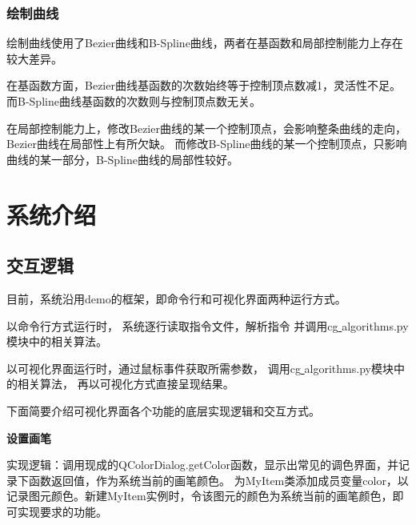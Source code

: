 \documentclass[a4paper,UTF8]{article}
\begin{document}
\subsubsection{绘制曲线}
绘制曲线使用了Bezier曲线和B-Spline曲线，两者在基函数和局部控制能力上存在较大差异。

在基函数方面，Bezier曲线基函数的次数始终等于控制顶点数减1，灵活性不足。
而B-Spline曲线基函数的次数则与控制顶点数无关。

在局部控制能力上，修改Bezier曲线的某一个控制顶点，会影响整条曲线的走向，Bezier曲线在局部性上有所欠缺。
而修改B-Spline曲线的某一个控制顶点，只影响曲线的某一部分，B-Spline曲线的局部性较好。



\section{系统介绍}
\subsection{交互逻辑}
目前，系统沿用demo的框架，即命令行和可视化界面两种运行方式。

以命令行方式运行时，
系统逐行读取指令文件，解析指令
并调用cg\underline{ }algorithms.py模块中的相关算法。

以可视化界面运行时，通过鼠标事件获取所需参数，
调用cg\underline{ }algorithms.py模块中的相关算法，
再以可视化方式直接呈现结果。

下面简要介绍可视化界面各个功能的底层实现逻辑和交互方式。

\textbf{设置画笔}

实现逻辑：调用现成的QColorDialog.getColor函数，显示出常见的调色界面，并记录下函数返回值，作为系统当前的画笔颜色。
为MyItem类添加成员变量color，以记录图元颜色。新建MyItem实例时，令该图元的颜色为系统当前的画笔颜色，即可实现要求的功能。
\end{document}

